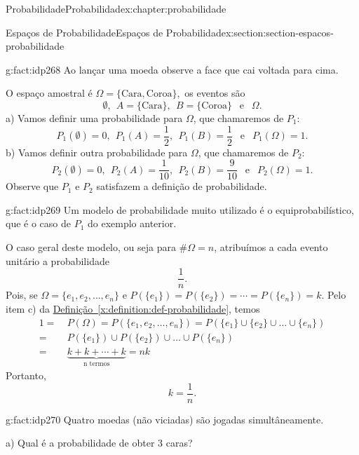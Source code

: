 \documentclass[oneside,10pt,]{book}
\newcommand{\xreffont}{\relax}
\numberwithin{equation}{section}
\newcommand{\amp}{&}
\begin{document}
\begin{chapterptx}{Probabilidade}{}{Probabilidade}{}{}{x:chapter:probabilidade}
\begin{sectionptx}{Espaços de Probabilidade}{}{Espaços de Probabilidade}{}{}{x:section:section-espacos-probabilidade}
\begin{fact}{}{}{g:fact:idp268}
Ao lançar uma moeda observe a face que cai voltada para cima.%
\par
O espaço amostral é \(\Omega = \{\text{Cara}, \text{Coroa}\},\) os eventos são%
\begin{equation*}
\emptyset, ~~ A = \{\text{Cara}\}, ~~B = \{\text{Coroa}\} ~~\text{ e }~~ \Omega. 
\end{equation*}
a) Vamos definir uma probabilidade para \(\Omega\), que chamaremos de \(P_1\):%
\begin{equation*}
P_1(\emptyset)=0, ~~ P_1(A) = \frac{1}{2}, ~~P_1(B) = \frac{1}{2} ~~\text{ e }~~ P_1(\Omega)=1.
\end{equation*}
b) Vamos definir outra probabilidade para \(\Omega\), que chamaremos de \(P_2\):%
\begin{equation*}
P_2(\emptyset)=0, ~~ P_2(A) = \frac{1}{10}, ~~P_2(B) = \frac{9}{10} ~~\text{ e }~~ P_2(\Omega)=1.
\end{equation*}
Observe que \(P_1\) e \(P_2\) satisfazem a definição de probabilidade.%
\end{fact}
\begin{fact}{}{}{g:fact:idp269}%
Um modelo de probabilidade muito utilizado é o equiprobabilístico, que é o caso de \(P_1\) do exemplo anterior.%
\par
O caso geral deste modelo, ou seja para \(\#\Omega = n\), atribuímos a cada evento unitário a probabilidade%
\begin{equation*}
\frac{1}{n}. 
\end{equation*}
Pois, se \(\Omega = \{e_1, e_2, \ldots, e_n\}\) e \(P(\{e_1\}) = P(\{e_2\}) = \cdots = P(\{e_n\})= k\). Pelo item c) da \hyperref[x:definition:def-probabilidade]{Definição~{\xreffont\ref{x:definition:def-probabilidade}}}, temos%
\begin{align*}
1 = \amp ~P(\Omega) = P(\{e_1, e_2, \ldots, e_n\}) = P(\{e_1\} \cup \{e_2\}\cup \ldots\cup \{e_n\})   \\
= \amp ~P(\{e_1\}) \cup P(\{e_2\})\cup \ldots\cup P(\{e_n\}) \\
= \amp ~ \underbrace{k+k+\cdots+k}_{\text{n termos}} = nk  
\end{align*}
Portanto,%
\begin{equation*}
k = \frac{1}{n}. 
\end{equation*}
%
\end{fact}
\begin{fact}{}{}{g:fact:idp270}%
Quatro moedas (não viciadas) são jogadas simultâneamente.%
\par
a) Qual é a probabilidade de obter 3 caras?%

\end{fact}
\end{sectionptx}
\end{chapterptx}
\end{document}

